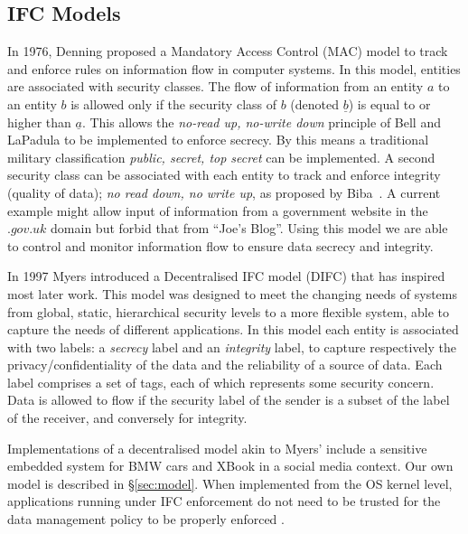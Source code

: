 \documentclass[10pt,journal,compsoc]{IEEEtran}
\begin{document}
\subsection{IFC Models}
\label{sec:related:models}

In 1976, Denning \cite{Denning:1976:LMS:360051.360056} proposed a Mandatory Access Control (MAC) model to track and enforce rules on information flow in computer systems.  
In this model, entities are associated with security classes. The flow of information from an entity $a$ to an entity $b$ is allowed only if the security class of $b$ (denoted $\underline{b}$) is equal to or higher than $\underline{a}$. 
This allows the \emph{no-read up, no-write down} principle of Bell and LaPadula \cite{bell73} to be implemented to enforce secrecy. By this means a traditional military classification \emph{public, secret, top secret} can be implemented.
A second security class can be associated with each entity to track and enforce integrity (quality of data); 
\emph{no read down, no write up}, as proposed by Biba~\cite{citeulike:3017234}. A current example might allow input of information from a government website in the $.gov.uk$ domain but forbid that from ``Joe's Blog''. 
Using this model we are able to control and monitor information flow to ensure data secrecy and integrity.

In 1997 Myers \cite{Myers97decentralized} introduced a Decentralised IFC model (DIFC)
that has inspired most later work. This model was designed to meet the changing needs of systems from global, static, hierarchical security levels to a more flexible system, able to capture the needs of different applications. In this model each entity is associated with two labels: a \emph{secrecy} label and an \emph{integrity} label, to capture respectively the privacy/confidentiality of the data and the reliability of a source of data. Each label comprises a set of tags, each of which represents some security concern. Data is allowed to flow if the security label of the sender is a subset of the label of the receiver, and conversely for integrity. 


Implementations of a decentralised model akin to Myers' include a sensitive embedded system for BMW cars \cite{bouard2013practical} and XBook \cite{singh2009xbook} in a social media context. Our own model is described in \S\ref{sec:model}.
When implemented from the OS kernel level, applications running under IFC enforcement do not need to be trusted for the data management policy 
to be properly enforced \cite{Krohn:2007:IFC:1294261.1294293}.
\end{document}
